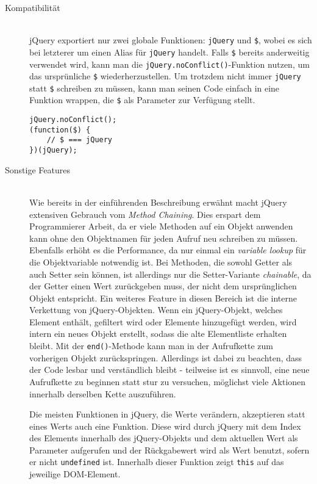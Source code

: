 \begin{description}
\item[Kompatibilität] \hfill \\
jQuery exportiert nur zwei globale Funktionen: \lstinline{jQuery} und \lstinline{$}, wobei es
sich bei letzterer um einen Alias für \lstinline{jQuery} handelt. Falls \lstinline{$} bereits
anderweitig verwendet wird, kann man die \lstinline{jQuery.noConflict()}-Funktion nutzen, um das
ursprünliche \lstinline{$} wiederherzustellen. Um trotzdem nicht immer \lstinline{jQuery} statt
\lstinline{$} schreiben zu müssen, kann man seinen Code einfach in eine Funktion wrappen, die
\lstinline{$} als Parameter zur Verfügung stellt.
\begin{lstlisting}[caption=Verwendung von \$.noConflict]
jQuery.noConflict();
(function($) {
    // $ === jQuery
})(jQuery);
\end{lstlisting}

\item[Sonstige Features] \hfill \\
Wie bereits in der einführenden Beschreibung erwähnt macht jQuery extensiven Gebrauch vom
\emph{Method Chaining}. Dies erspart dem Programmierer Arbeit, da er viele Methoden auf ein Objekt
anwenden kann ohne den Objektnamen für jeden Aufruf neu schreiben zu müssen. Ebenfalls erhöht es die
Performance, da nur einmal ein \emph{variable lookup} für die Objektvariable notwendig ist. Bei
Methoden, die sowohl Getter als auch Setter sein können, ist allerdings nur die Setter-Variante
\emph{chainable}, da der Getter einen Wert zurückgeben muss, der nicht dem ursprünglichen Objekt
entspricht. Ein weiteres Feature in diesen Bereich ist die interne Verkettung von jQuery-Objekten.
Wenn ein jQuery-Objekt, welches Element enthält, gefiltert wird oder Elemente hinzugefügt werden,
wird intern ein neues Objekt erstellt, sodass die alte Elementliste erhalten bleibt. Mit der
\lstinline{end()}-Methode kann man in der Aufrufkette zum vorherigen Objekt zurückspringen.
Allerdings ist dabei zu beachten, dass der Code lesbar und verständlich bleibt - teilweise ist es
sinnvoll, eine neue Aufrufkette zu beginnen statt stur zu versuchen, möglichst viele Aktionen
innerhalb derselben Kette auszuführen.

Die meisten Funktionen in jQuery, die Werte verändern, akzeptieren statt eines Werts auch eine
Funktion. Diese wird durch jQuery mit dem Index des Elements innerhalb des jQuery-Objekts und dem
aktuellen Wert als Parameter aufgerufen und der Rückgabewert wird als Wert benutzt, sofern er nicht
\lstinline{undefined} ist. Innerhalb dieser Funktion zeigt \lstinline{this} auf das jeweilige
DOM-Element.


\end{description}
